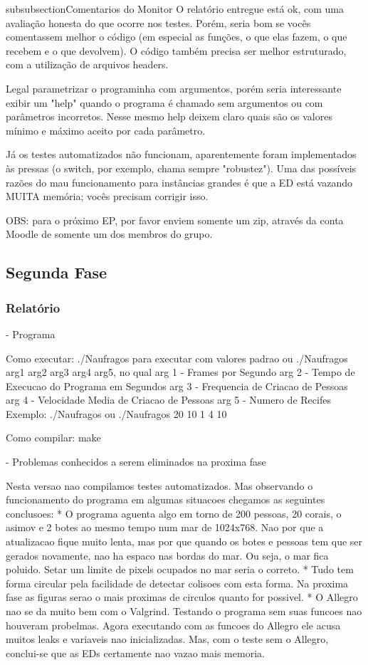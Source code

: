 \documentclass[a4paper,12pt]{article}
\begin{document}
subsubsection{Comentarios do Monitor}
O relatório entregue está ok, com uma avaliação honesta do que ocorre nos testes. Porém, seria bom se vocês comentassem melhor o código (em especial as funções, o que elas fazem, o que recebem e o que devolvem). O código também precisa ser melhor estruturado, com a utilização de arquivos headers.

Legal parametrizar o programinha com argumentos, porém seria interessante exibir um "help" quando o programa é chamado sem argumentos ou com parâmetros incorretos. Nesse mesmo help deixem claro quais são os valores mínimo e máximo aceito por cada parâmetro.

Já os testes automatizados não funcionam, aparentemente foram implementados às pressas (o switch, por exemplo, chama sempre "robustez"). Uma das possíveis razões do mau funcionamento para instâncias grandes é que a ED está vazando MUITA memória; vocês precisam corrigir isso.

OBS: para o próximo EP, por favor enviem somente um zip, através da conta Moodle de somente um dos membros do grupo.

\subsection{Segunda Fase}
\subsubsection{Relat\'orio}
- Programa

Como executar:
./Naufragos para executar com valores padrao ou
./Naufragos arg1 arg2 arg3 arg4 arg5, no qual 
	arg 1 - Frames por Segundo
	arg 2 - Tempo de Execucao do Programa em Segundos
	arg 3 - Frequencia de Criacao de Pessoas
	arg 4 - Velocidade Media de Criacao de Pessoas
	arg 5 - Numero de Recifes
Exemplo: ./Naufragos ou ./Naufragos 20 10 1 4 10

Como compilar: make

- Problemas conhecidos a serem eliminados na proxima fase

Nesta versao nao compilamos testes automatizados. Mas observando o funcionamento do programa em algumas situacoes chegamos as seguintes conclusoes:
 * O programa aguenta algo em torno de 200 pessoas, 20 corais, o asimov e 2 botes ao mesmo tempo num mar de 1024x768. Nao por que a atualizacao fique muito lenta, mas por que quando os botes e pessoas tem que ser gerados novamente, nao ha espaco nas bordas do mar. Ou seja, o mar fica poluido. Setar um limite de pixels ocupados no mar seria o correto.
 * Tudo tem forma circular pela facilidade de detectar colisoes com esta forma. Na proxima fase as figuras serao o mais proximas de circulos quanto for possivel.
 * O Allegro nao se da muito bem com o Valgrind. Testando o programa sem suas funcoes nao houveram probelmas. Agora executando com as funcoes do Allegro ele acusa muitos leaks e variaveis nao inicializadas. Mas, com o teste sem o Allegro, conclui-se que as EDs certamente nao vazao mais memoria.
\end{document}

